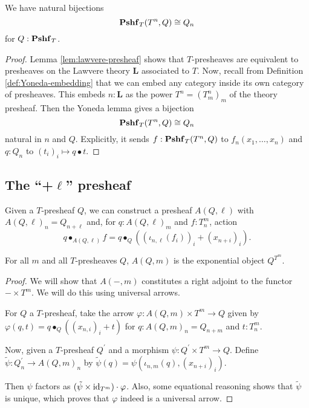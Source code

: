\begin{lemma}\label{rem:presheaf-Yoneda}
  We have natural bijections
  \[ \mathbf{Pshf}_{T}(T^n, Q) \cong Q_n \]
  for $ Q : \mathbf{Pshf}_{T} $.
\end{lemma}
\begin{proof}
  Lemma \ref{lem:lawvere-presheaf} shows that $ T $-presheaves are equivalent to presheaves on the Lawvere theory $ \mathbf L $ associated to $ T $. Now, recall from Definition \ref{def:Yoneda-embedding} that we can embed any category inside its own category of presheaves. This embeds $ n: \mathbf L $ as the power $ T^n = (T_m^n)_m $ of the theory presheaf. Then the Yoneda lemma gives a bijection
  \[ \mathbf{Pshf}_{T}(T^n, Q) \cong Q_n \]
  natural in $ n $ and $ Q $. Explicitly, it sends $ f: \mathbf{Pshf}_{T}(T^n, Q) $ to $ f_n(x_1, \dots, x_n) $ and $ q: Q_n $ to $ (t_i)_i \mapsto q \bullet t $.
\end{proof}

\subsection{The ``+\texorpdfstring{$ \ell $}{l}'' presheaf}

\begin{example}
  Given a $ T $-presheaf $ Q $, we can construct a presheaf $ A(Q, \ell) $ with $ A(Q, \ell)_n = Q_{n + \ell} $ and, for $ q: A(Q, \ell)_m $ and $ f: T_n^m $, action
  \[ q \bullet_{A(Q, \ell)} f = q \bullet_Q ((\iota_{n, \ell} (f_i))_i + (x_{n + i})_i). \]
\end{example}

\begin{lemma}
  For all $ m $ and all $ T $-presheaves $ Q $, $ A(Q, m) $ is the exponential object $ Q^{T^m} $.
\end{lemma}
\begin{proof}
  We will show that $ A(-, m) $ constitutes a right adjoint to the functor $ - \times T^m $. We will do this using universal arrows.

  For $ Q $ a $ T $-presheaf, take the arrow $ \varphi: A(Q, m) \times T^m \to Q $ given by $ \varphi(q, t) = q \bullet_Q ((x_{n, i})_i + t) $ for $ q: A(Q, m)_n = Q_{n + m} $ and $ t: T^m_n $.

  Now, given a $ T $-presheaf $ Q^\prime $ and a morphism $ \psi: Q^\prime \times T^m \to Q $. Define $ \tilde \psi: Q^\prime_n \to A(Q, m)_n $ by $ \tilde \psi(q) = \psi(\iota_{n, m}(q), (x_{n + i})_i) $.

  Then $ \psi $ factors as $ (\tilde \psi \times \text{id}_{T^m}) \cdot \varphi $. Also, some equational reasoning shows that $ \tilde \psi $ is unique, which proves that $ \varphi $ indeed is a universal arrow.
\end{proof}
